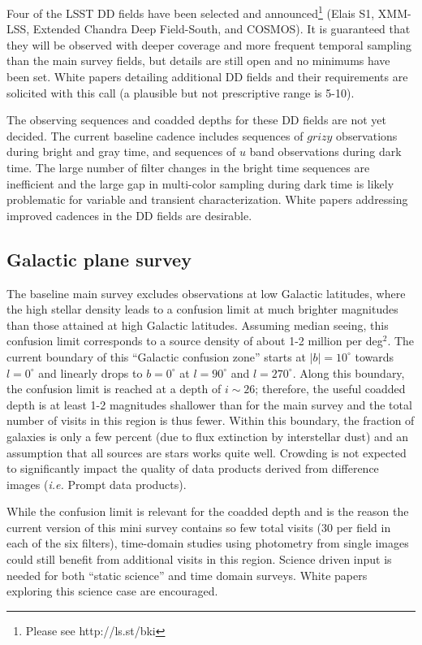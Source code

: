 \documentclass[DM,lsstdraft,toc,usenatbib]{lsstdoc}
\begin{document}
Four of the LSST DD fields have been selected and announced\footnote{Please see http://ls.st/bki} (Elais S1, 
XMM-LSS, Extended Chandra Deep Field-South, and COSMOS). It is guaranteed that they 
will be observed with deeper coverage and more frequent temporal sampling than the main 
survey fields, but details are still open and no minimums have been set. White papers detailing additional DD fields and their
requirements are solicited with this call (a plausible but not prescriptive range is 5-10).

The observing sequences and coadded depths for these DD fields are not yet decided. The current baseline
cadence includes sequences of $grizy$ observations during bright and gray time, and sequences of $u$ 
band observations during dark time. The large number of filter changes in the bright time sequences
are inefficient and the large gap in multi-color sampling during dark time is likely problematic 
for variable and transient characterization. White papers addressing improved cadences 
in the DD fields are desirable.


\subsection{Galactic plane survey \label{sec:GP}}

The baseline main survey excludes observations at low Galactic latitudes, where the high 
stellar density leads to a confusion limit at much brighter magnitudes than those attained 
at high Galactic latitudes. Assuming median seeing, this confusion limit corresponds to a
source density of about 1-2 million per deg$^2$. The current boundary of this ``Galactic
confusion zone'' starts at $|b|=10^\circ$ towards $l=0^\circ$ and linearly drops to $b=0^\circ$
at $l=90^\circ$ and $l=270^\circ$. Along this boundary, the confusion limit is reached at a
depth of $i \sim 26$; therefore, the useful coadded depth is at least 1-2 magnitudes 
shallower than for the main survey and the total number of visits in this region is thus fewer. 
Within this boundary, the fraction of galaxies is only a few percent (due to flux extinction 
by interstellar dust) and an assumption that all sources are stars works quite well. 
Crowding is not expected to significantly impact the quality of data products derived from difference images
({\it i.e.} Prompt data products). 

While the confusion limit is relevant for the coadded depth and is the reason the current version of this mini survey
contains so few total visits (30 per field in each of the six filters), time-domain studies using photometry from 
single images could still benefit from additional visits in this region. Science driven input is needed for both ``static science'' 
and time domain surveys. White papers exploring this science case are encouraged.
\end{document}
